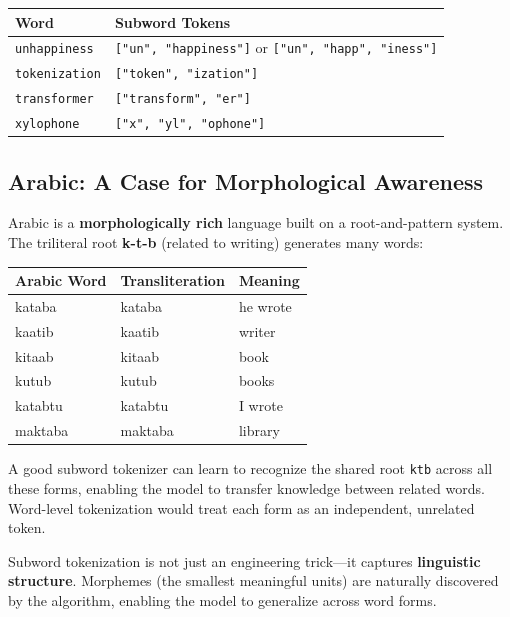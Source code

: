 \documentclass[11pt,a4paper]{article}
\begin{document}
\begin{center}
\renewcommand{\arraystretch}{1.3}
\begin{tabular}{@{}ll@{}}
\toprule
\textbf{Word} & \textbf{Subword Tokens} \\
\midrule
\texttt{unhappiness} & \texttt{["un", "happiness"]} or \texttt{["un", "happ", "iness"]} \\
\texttt{tokenization} & \texttt{["token", "ization"]} \\
\texttt{transformer} & \texttt{["transform", "er"]} \\
\texttt{xylophone} & \texttt{["x", "yl", "ophone"]} \\
\bottomrule
\end{tabular}
\end{center}

\subsection{Arabic: A Case for Morphological Awareness}

Arabic is a \textbf{morphologically rich} language built on a root-and-pattern system. The triliteral root \textbf{k-t-b} (related to writing) generates many words:

\begin{center}
\renewcommand{\arraystretch}{1.3}
\begin{tabular}{@{}lll@{}}
\toprule
\textbf{Arabic Word} & \textbf{Transliteration} & \textbf{Meaning} \\
\midrule
kataba & kataba & he wrote \\
kaatib & kaatib & writer \\
kitaab & kitaab & book \\
kutub & kutub & books \\
katabtu & katabtu & I wrote \\
maktaba & maktaba & library \\
\bottomrule
\end{tabular}
\end{center}

A good subword tokenizer can learn to recognize the shared root \texttt{ktb} across all these forms, enabling the model to transfer knowledge between related words. Word-level tokenization would treat each form as an independent, unrelated token.

\begin{tcolorbox}[intuitionbox={Key Insight}]
Subword tokenization is not just an engineering trick---it captures \textbf{linguistic structure}. Morphemes (the smallest meaningful units) are naturally discovered by the algorithm, enabling the model to generalize across word forms.
\end{tcolorbox}
\end{document}
